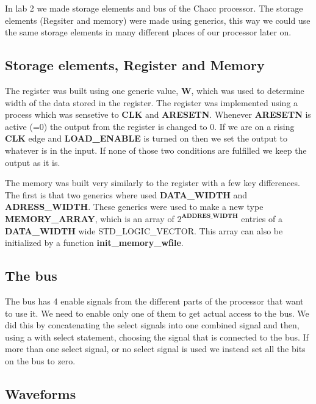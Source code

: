 In lab 2 we made storage elements and bus of the Chacc processor. The storage
elements (Regsiter and memory) were made using generics, this way we could use
the same storage elements in many different places of our processor later on.
\subsection*{Storage elements, Register and Memory}
The register was built using one generic value, \textbf{W}, which was used to
determine width of the data stored in the register. The register was implemented
using a process which was sensetive to \textbf{CLK} and \textbf{ARESETN}.
Whenever \textbf{ARESETN} is active (=0) the output from the register is changed
to 0. If we are on a rising \textbf{CLK} edge and \textbf{LOAD\_ENABLE} is
turned on then we set the output to whatever is in the input. If none of those
two conditions are fulfilled we keep the output as it is.

The memory was built very similarly to the register with a few key differences.
The first is that two generics where used \textbf{DATA\_WIDTH} and
\textbf{ADRESS\_WIDTH}. These generics were used to make a new type
\textbf{MEMORY\_ARRAY}, which is an array of $2^{\textbf{ADDRES\_WIDTH}}$
entries of a \textbf{DATA\_WIDTH} wide STD\_LOGIC\_VECTOR. This array can also be
initialized by a function \textbf{init\_memory\_wfile}.
\subsection*{The bus}
The bus has 4 enable signals from the different parts of the processor that want
to use it. We need to enable only one of them to get actual access to the bus.
We did this by concatenating the select signals into one combined signal and
then, using a with select statement, choosing the signal that is connected to
the bus. If more than one select signal, or no select signal is used we instead
set all the bits on the bus to zero.
\subsection*{Waveforms}